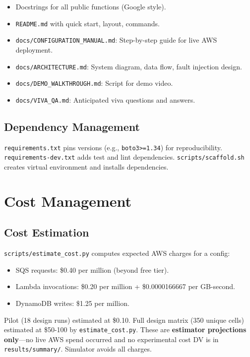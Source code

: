 \begin{itemize}
    \item Docstrings for all public functions (Google style).
    \item \texttt{README.md} with quick start, layout, commands.
    \item \texttt{docs/CONFIGURATION\_MANUAL.md}: Step-by-step guide for live AWS deployment.
    \item \texttt{docs/ARCHITECTURE.md}: System diagram, data flow, fault injection design.
    \item \texttt{docs/DEMO\_WALKTHROUGH.md}: Script for demo video.
    \item \texttt{docs/VIVA\_QA.md}: Anticipated viva questions and answers.
\end{itemize}

\subsection{Dependency Management}

\texttt{requirements.txt} pins versions (e.g., \texttt{boto3>=1.34}) for reproducibility. \texttt{requirements-dev.txt} adds test and lint dependencies. \texttt{scripts/scaffold.sh} creates virtual environment and installs dependencies.

\section{Cost Management}

\subsection{Cost Estimation}

\texttt{scripts/estimate\_cost.py} computes expected AWS charges for a config:
\begin{itemize}
    \item SQS requests: \$0.40 per million (beyond free tier).
    \item Lambda invocations: \$0.20 per million + \$0.0000166667 per GB-second.
    \item DynamoDB writes: \$1.25 per million.
\end{itemize}

Pilot (18 design runs) estimated at \$0.10. Full design matrix (350 unique cells) estimated at \$50-100 by \texttt{estimate\_cost.py}. These are \textbf{estimator projections only}---no live AWS spend occurred and no experimental cost DV is in \texttt{results/summary/}. Simulator avoids all charges.

